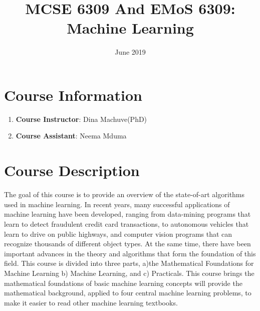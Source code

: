 \documentclass[a4, 10pt]{article}
\title{\textbf{MCSE 6309 And EMoS 6309:\\ Machine Learning }}
\date{June 2019}
\begin{document}
\maketitle

\section*{Course Information}

\begin{enumerate}
	\item \textbf{Course Instructor}: Dina Machuve(PhD)
	\item \textbf{Course Assistant}: Neema Mduma
\end{enumerate}

\section{Course Description}
The goal of this course is to provide an overview of the state-of-art algorithms used in
machine learning. In recent years, many successful applications of machine learning
have been developed, ranging from data-mining programs that learn to detect
fraudulent credit card transactions, to autonomous vehicles that learn to drive on
public highways, and computer vision programs that can recognize thousands of
different object types. At the same time, there have been important advances in the
theory and algorithms that form the foundation of this field. This course is divided into
three parts, a)the Mathematical Foundations for Machine Learning b) Machine Learning, and c) Practicals. This course brings the mathematical foundations of basic machine learning concepts
will provide the mathematical background, applied to four central machine learning problems, to make it easier to read other machine learning textbooks. 
\end{document}

